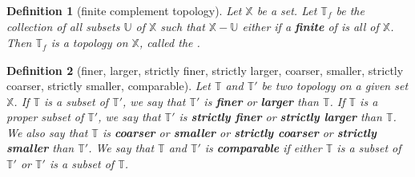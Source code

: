 \documentclass[twoside]{article}
\newtheorem{definition}{Definition}[section]
\begin{document}
            \begin{definition}[finite complement topology]
                  Let $ \mathbb{X} $ be a set. Let $ \mathbb{T}_{\mathit{f}} $ be the collection of all subsets $ \mathbb{U} $ of $ \mathbb{X} $ such that $ \mathbb{X} - \mathbb{U} $ either if a \textbf{finite}  of is all of $ \mathbb{X} $. Then $ \mathbb{T}_{\mathit{f}} $ is a topology on $ \mathbb{X} $, called the \textit{\textbf{}}.
            \end{definition}

            \begin{definition}[finer, larger, strictly finer, strictly larger, coarser, smaller, strictly coarser, strictly smaller, comparable]
                  Let $ \mathbb{T} $ and $ \mathbb{T'} $ be two topology on a given set $ \mathbb{X} $. If $ \mathbb{T} $ is  a subset of $ \mathbb{T'} $, we say that $ \mathbb{T'} $ is \textit{\textbf{finer}} or \textit{\textbf{larger}} than $ \mathbb{T} $. If $ \mathbb{T} $ is a proper subset of $ \mathbb{T'} $, we say that $ \mathbb{T'} $ is \textit{\textbf{strictly finer}} or \textit{\textbf{strictly larger}}  than $ \mathbb{T} $.
                  We also say that $ \mathbb{T} $ is \textit{\textbf{coarser}} or \textit{\textbf{smaller}} or \textit{\textbf{strictly coarser}} or \textit{\textbf{strictly smaller}} than $ \mathbb{T'} $.
                  We say that $ \mathbb{T} $ and $ \mathbb{T'} $ is \textit{\textbf{comparable}} if either $ \mathbb{T} $ is a subset of $ \mathbb{T'} $ or $ \mathbb{T'} $ is a subset of $ \mathbb{T} $.
            \end{definition}
\end{document}

